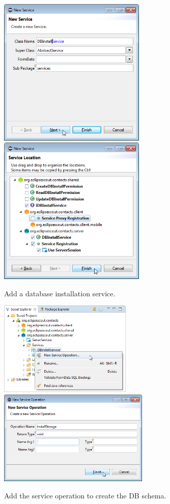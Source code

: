 \documentclass[a4paper,10pt,twoside]{book}
\begin{document}
\begin{figure}
\includegraphics[width=7cm]{new_service_dbinstall_1.png} \hspace{5mm}
\includegraphics[width=7cm]{new_service_dbinstall_2.png} 
\caption{Add a database installation service. }
\end{figure}

\begin{figure}
\includegraphics[height=4.5cm]{new_operation_installstorage_contextmenu.png} \hspace{5mm}
\includegraphics[height=4.5cm]{new_operation_installstorage.png} 
\caption{Add the service operation to create the DB schema. }
\end{figure}
\end{document}
